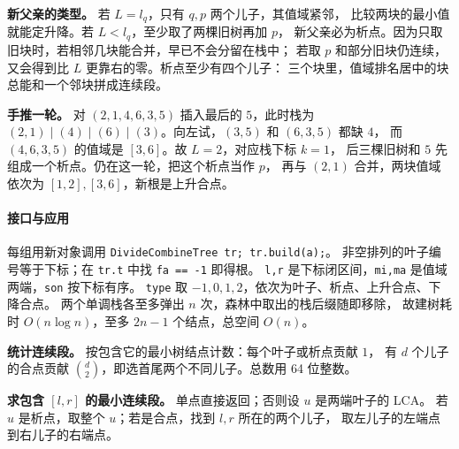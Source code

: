 \textbf{新父亲的类型。} 若 $L=l_q$，只有 $q,p$ 两个儿子，其值域紧邻，
比较两块的最小值就能定升降。若 $L<l_q$，至少取了两棵旧树再加 $p$，
新父亲必为析点。因为只取旧块时，若相邻几块能合并，早已不会分留在栈中；
若取 $p$ 和部分旧块仍连续，又会得到比 $L$ 更靠右的零。析点至少有四个儿子：
三个块里，值域排名居中的块总能和一个邻块拼成连续段。

\textbf{手推一轮。} 对 $(2,1,4,6,3,5)$ 插入最后的 $5$，此时栈为
$(2,1)\mid(4)\mid(6)\mid(3)$。向左试，$(3,5)$ 和 $(6,3,5)$ 都缺 $4$，
而 $(4,6,3,5)$ 的值域是 $[3,6]$。故 $L=2$，对应栈下标 $k=1$，
后三棵旧树和 $5$ 先组成一个析点。仍在这一轮，把这个析点当作 $p$，
再与 $(2,1)$ 合并，两块值域依次为 $[1,2],[3,6]$，新根是上升合点。

\paragraph*{接口与应用}
每组用新对象调用 \texttt{DivideCombineTree tr; tr.build(a);}。
非空排列的叶子编号等于下标；在 \texttt{tr.t} 中找 \texttt{fa == -1} 即得根。
\texttt{l,r} 是下标闭区间，\texttt{mi,ma} 是值域两端，\texttt{son} 按下标有序。
\texttt{type} 取 $-1,0,1,2$，依次为叶子、析点、上升合点、下降合点。
两个单调栈各至多弹出 $n$ 次，森林中取出的栈后缀随即移除，
故建树耗时 $O(n\log n)$，至多 $2n-1$ 个结点，总空间 $O(n)$。

\textbf{统计连续段。} 按包含它的最小树结点计数：每个叶子或析点贡献 $1$，
有 $d$ 个儿子的合点贡献 $\binom d2$，即选首尾两个不同儿子。总数用 64 位整数。

\textbf{求包含 $[l,r]$ 的最小连续段。} 单点直接返回；否则设 $u$ 是两端叶子的 LCA。
若 $u$ 是析点，取整个 $u$；若是合点，找到 $l,r$ 所在的两个儿子，
取左儿子的左端点到右儿子的右端点。
